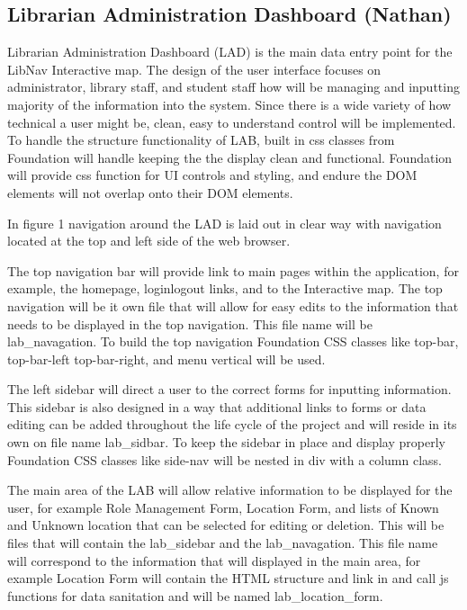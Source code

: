 \documentclass[letterpaper,10pt,titlepage, onecolumn, compsoc]{IEEEtran}
\begin{document}
\subsection{Librarian Administration Dashboard (Nathan)}
Librarian Administration Dashboard (LAD) is the main data entry point for the LibNav Interactive map. The design of the user interface focuses on administrator, library staff, and student staff how will be managing and inputting majority of the information into the system. Since there is a wide variety of how technical a user might be, clean, easy to understand control will be implemented. To handle the structure functionality of LAB, built in css classes from Foundation will handle keeping the the display clean and functional. Foundation will provide css function for UI controls and styling, and endure the DOM elements will not overlap onto their DOM elements.

In figure 1 navigation around the LAD is laid out in clear way with navigation located at the top and left side of the web browser. 

The top navigation bar will provide link to main pages within the application, for example, the homepage, login\/logout links, and to the Interactive map. The top navigation will be it own file that will allow for easy edits to the information that needs to be displayed in the top navigation. This file name will be lab\_navagation. To build the top navigation Foundation CSS classes like top-bar, top-bar-left top-bar-right, and menu vertical will be used. 

The left sidebar will direct a user to the correct forms for inputting information. This sidebar is also designed in a way that additional links to forms or data editing can be added throughout the life cycle of the project and will reside in its own on file name lab\_sidbar. To keep the sidebar in place and display properly Foundation CSS classes like side-nav will be nested in div with a column class.

The main area of the LAB will allow relative information to be displayed for the user, for example  Role Management Form, Location Form, and lists of Known and Unknown location that can be selected for editing or deletion. This will be files that will contain the lab\_sidebar and the lab\_navagation. This file name will correspond to the information that will displayed in the main area, for example Location Form will contain the HTML structure and link in and call js functions for data sanitation and will be named lab\_location\_form.
\end{document}
